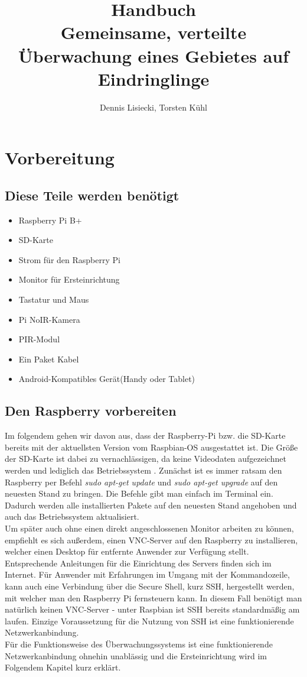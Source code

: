 \documentclass[12pt,a4paper]{scrreprt}
\title{Handbuch \\ Gemeinsame, verteilte Überwachung eines Gebietes auf Eindringlinge}
\author{Dennis Lisiecki, Torsten Kühl}
\begin{document}
\maketitle	%
\tableofcontents	%


\chapter{Vorbereitung}

\section{Diese Teile werden benötigt}
\begin{itemize}
\item Raspberry Pi B+
\item SD-Karte
\item Strom für den Raspberry Pi
\item Monitor für Ersteinrichtung
\item Tastatur und Maus
\item Pi NoIR-Kamera
\item PIR-Modul
\item Ein Paket Kabel
\item Android-Kompatibles Gerät(Handy oder Tablet)
\end{itemize}

\section{Den Raspberry vorbereiten}
Im folgendem gehen wir davon aus, dass der Raspberry-Pi bzw. die SD-Karte bereits mit der aktuellsten Version vom Raspbian-OS ausgestattet ist. Die Größe der SD-Karte ist dabei zu vernachlässigen, da keine Videodaten aufgezeichnet werden und lediglich das Betriebssystem . Zunächst ist es immer ratsam den Raspberry per Befehl \textit{sudo apt-get update} und \textit{sudo apt-get upgrade} auf den neuesten Stand zu bringen. Die Befehle gibt man einfach im Terminal ein. Dadurch werden alle installierten Pakete auf den neuesten Stand angehoben und auch das Betriebssystem aktualisiert. \\Um später auch ohne einen direkt angeschlossenen Monitor arbeiten zu können, empfiehlt es sich außerdem, einen VNC-Server auf den Raspberry zu installieren, welcher einen Desktop für entfernte Anwender zur Verfügung stellt. Entsprechende Anleitungen für die Einrichtung des Servers finden sich im Internet. Für Anwender mit Erfahrungen im Umgang mit der Kommandozeile, kann auch eine Verbindung über die Secure Shell, kurz SSH, hergestellt werden, mit welcher man den Raspberry Pi fernsteuern kann. In diesem Fall benötigt man natürlich keinen VNC-Server - unter Raspbian ist SSH bereits standardmäßig am laufen. Einzige Voraussetzung für die Nutzung von SSH ist eine funktionierende Netzwerkanbindung.  \\Für die Funktionsweise des Überwachungssystems ist eine funktionierende Netzwerkanbindung ohnehin unablässig und die Ersteinrichtung wird im Folgendem Kapitel kurz erklärt.
\end{document}
